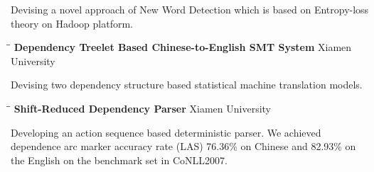 \documentclass{res}
\begin{document}
\begin{resume}
   Devising a novel approach of New Word Detection which is based on Entropy-loss theory on Hadoop platform.
   \begin{tabbing}
   \hspace{2.5in}\= \hspace{3in}\= \kill %
    {\bf Dependency Treelet Based Chinese-to-English SMT System} \> \>Xiamen University\\
   \end{tabbing}\vspace{-20pt}      %
   Devising two dependency structure based statistical machine translation models. 
   \begin{tabbing}
   \hspace{2.5in}\= \hspace{3in}\= \kill %
    {\bf Shift-Reduced Dependency Parser} \> \>Xiamen University\\
   \end{tabbing}\vspace{-20pt}      %
   Developing an action sequence based deterministic parser.
   We achieved dependence arc marker accuracy rate (LAS) 76.36\% on Chinese and 82.93\% on the English on the benchmark set in CoNLL2007.






\end{resume}
\end{document}
